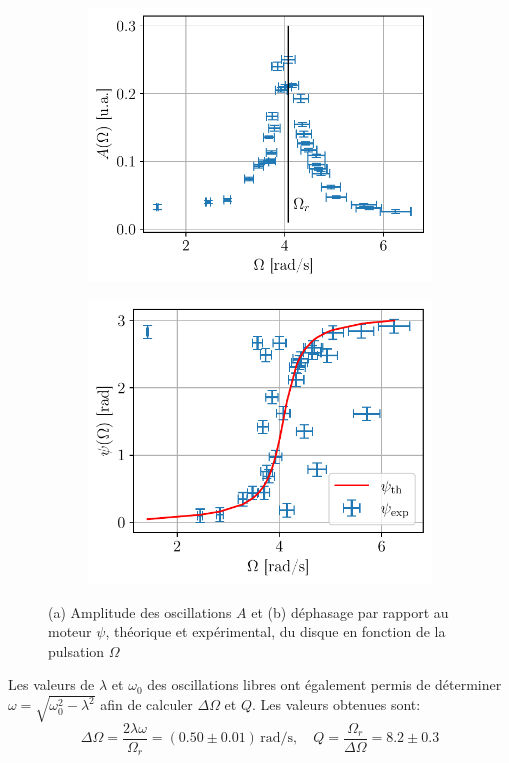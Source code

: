 \begin{figure}[h]
    \centering
    \begin{subfigure}{0.48\linewidth}
        \centering
        \includegraphics[width=\linewidth]{figures/resonance_A.pdf}
        \caption{}
        \label{fig:res_A}
    \end{subfigure}
    \begin{subfigure}{0.48\linewidth}
        \centering
        \includegraphics[width=\linewidth]{figures/resonance_psi.pdf}
        \caption{}
        \label{fig:res_psi}
    \end{subfigure}
    \caption{(a) Amplitude des oscillations $A$ et (b) déphasage par rapport au moteur $\psi$, théorique et expérimental, du disque en fonction de la pulsation $\Omega$}
    \label{fig:resonance}
\end{figure}

Les valeurs de $\lambda$ et $\omega_0$ des oscillations libres ont également permis de déterminer $\omega = \sqrt{\omega_0^2 - \lambda^2}$ afin de calculer $\Delta \Omega$ et $Q$. Les valeurs obtenues sont:
\[
    \Delta \Omega = \frac{2 \lambda \omega}{\Omega_r} = (0.50\pm0.01) \, \si{\radian\per\second} , \quad Q = \frac{\Omega_r}{\Delta\Omega} = 8.2\pm0.3
\]

